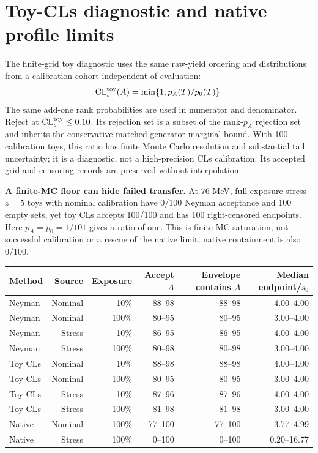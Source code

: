 \documentclass[10pt]{article}
\newcommand{\CLs}{\mathrm{CL}_{s}}
\begin{document}
\clearpage\section*{Toy-CLs diagnostic and native profile limits}


The finite-grid toy diagnostic uses the same raw-yield ordering and distributions from a calibration cohort independent of evaluation:\[\CLs^{\rm toy}(A)=\min\{1,p_A(T)/p_0(T)\}.\]The same add-one rank probabilities are used in numerator and denominator. Reject at $\CLs^{\rm toy}\leq0.10$. Its rejection set is a subset of the rank-$p_A$ rejection set and inherits the conservative matched-generator marginal bound. With 100 calibration toys, this ratio has finite Monte Carlo resolution and substantial tail uncertainty; it is a diagnostic, not a high-precision CLs calibration. Its accepted grid and censoring records are preserved without interpolation.

\textbf{A finite-MC floor can hide failed transfer.} At 76 MeV, full-exposure stress $z=5$ toys with nominal calibration have 0/100 Neyman acceptance and 100 empty sets, yet toy CLs accepts 100/100 and has 100 right-censored endpoints. Here $p_A=p_0=1/101$ gives a ratio of one. This is finite-MC saturation, not successful calibration or a rescue of the native limit; native containment is also 0/100.

\begin{center}\footnotesize\begin{tabular}{lrrrrr}\toprule
Method & Source & Exposure & Accept $A$ & Envelope contains $A$ & Median endpoint/$s_0$\\\midrule
Neyman & Nominal & 10\% & 88--98 & 88--98 & 4.00--4.00\\
Neyman & Nominal & 100\% & 80--95 & 80--95 & 3.00--4.00\\
Neyman & Stress & 10\% & 86--95 & 86--95 & 4.00--4.00\\
Neyman & Stress & 100\% & 80--98 & 80--98 & 3.00--4.00\\
Toy CLs & Nominal & 10\% & 88--98 & 88--98 & 4.00--4.00\\
Toy CLs & Nominal & 100\% & 80--95 & 80--95 & 3.00--4.00\\
Toy CLs & Stress & 10\% & 87--96 & 87--96 & 4.00--4.00\\
Toy CLs & Stress & 100\% & 81--98 & 81--98 & 3.00--4.00\\
Native & Nominal & 100\% & 77--100 & 77--100 & 3.77--4.99\\
Native & Stress & 100\% & 0--100 & 0--100 & 0.20--16.77\\
\bottomrule\end{tabular}\end{center}
\end{document}
